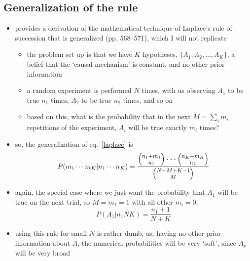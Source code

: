 \documentclass[../jaynes_prob_theory_notes.tex]{subfiles}
\begin{document}
            \subsection{Generalization of the rule}
                \begin{itemize} 
                    \item provides a derivation of the mathematical technique of Laplace's rule of succession that is generalized (pp. 568--571), which I will not replicate
                        \begin{itemize} 
                            \item the problem set up is that we have \(K\) hypotheses, \(\{A_1, A_2, \ldots, A_K\}\), a belief that the `causal mechanism' is constant, and no other prior information
                            \item a random experiment is performed \(N\) times, with us observing \(A_1\) to be true \(n_1\) times, \(A_2\) to be true \(n_2\) times, and so on
                            \item based on this, what is the probability that in the next \(M = \sum_{i} m_i\) repetitions of the experiment, \(A_i\) will be true exactly \(m_i\) times?
                        \end{itemize}
                    \item so, the generalization of eq.~\ref{laplace} is 
                        \begin{equation} 
                            \label{general_laplace}
                            P(m_1 \cdots m_K | n_1 \cdots n_K) = \mathlarger{\frac{\binom{n_1 + m_1}{n_1} \cdots \binom{n_K + m_K}{n_k}}{\binom{N+M+K-1}{M}}}
                        \end{equation}
                    \item again, the special case where we just want the probability that \(A_1\) will be true on the next trial, so \(M=m_1 = 1\) with all other \(m_i = 0\),
                        \begin{equation*} 
                            P(A_1|n_1 NK) = \frac{n_1 + 1}{N+K}
                        \end{equation*}
                    \item using this rule for small \(N\) is rather dumb, as, having no other prior information about \(A\), the numerical probabilities will be very `soft', since \(A_p\) will be very broad
                \end{itemize}
\end{document}
